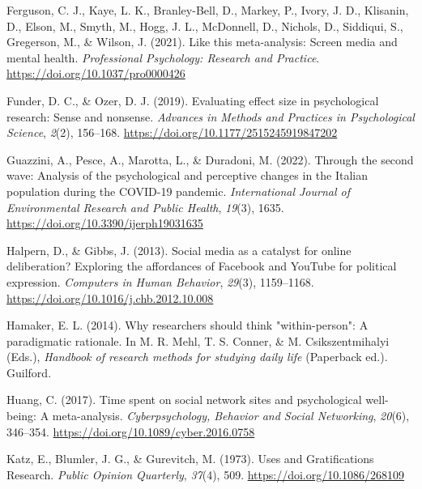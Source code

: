 \documentclass[
  man,floatsintext]{apa7}
\newlength{\cslhangindent}
\newlength{\cslentryspacingunit} %
\newenvironment{CSLReferences}[2] %
 {%
  \setlength{\parindent}{0pt}
  \ifodd #1
  \let\oldpar\par
  \def\par{\hangindent=\cslhangindent\oldpar}
  \fi
  \setlength{\parskip}{#2\cslentryspacingunit}
 }%
 {}
\begin{document}
\begin{CSLReferences}{1}{0}
\leavevmode{}%
Ferguson, C. J., Kaye, L. K., Branley-Bell, D., Markey, P., Ivory, J. D., Klisanin, D., Elson, M., Smyth, M., Hogg, J. L., McDonnell, D., Nichols, D., Siddiqui, S., Gregerson, M., \& Wilson, J. (2021). Like this meta-analysis: {Screen} media and mental health. \emph{Professional Psychology: Research and Practice}. \url{https://doi.org/10.1037/pro0000426}

\leavevmode{}%
Funder, D. C., \& Ozer, D. J. (2019). Evaluating effect size in psychological research: {Sense} and nonsense. \emph{Advances in Methods and Practices in Psychological Science}, \emph{2}(2), 156--168. \url{https://doi.org/10.1177/2515245919847202}

\leavevmode{}%
Guazzini, A., Pesce, A., Marotta, L., \& Duradoni, M. (2022). Through the second wave: {Analysis} of the psychological and perceptive changes in the {Italian} population during the {COVID-19} pandemic. \emph{International Journal of Environmental Research and Public Health}, \emph{19}(3), 1635. \url{https://doi.org/10.3390/ijerph19031635}

\leavevmode{}%
Halpern, D., \& Gibbs, J. (2013). Social media as a catalyst for online deliberation? {Exploring} the affordances of {Facebook} and {YouTube} for political expression. \emph{Computers in Human Behavior}, \emph{29}(3), 1159--1168. \url{https://doi.org/10.1016/j.chb.2012.10.008}

\leavevmode{}%
Hamaker, E. L. (2014). Why researchers should think "within-person": {A} paradigmatic rationale. In M. R. Mehl, T. S. Conner, \& M. Csikszentmihalyi (Eds.), \emph{Handbook of research methods for studying daily life} (Paperback ed.). {Guilford}.

\leavevmode{}%
Huang, C. (2017). Time spent on social network sites and psychological well-being: {A} meta-analysis. \emph{Cyberpsychology, Behavior and Social Networking}, \emph{20}(6), 346--354. \url{https://doi.org/10.1089/cyber.2016.0758}

\leavevmode{}%
Katz, E., Blumler, J. G., \& Gurevitch, M. (1973). Uses and {Gratifications Research}. \emph{Public Opinion Quarterly}, \emph{37}(4), 509. \url{https://doi.org/10.1086/268109}


\end{CSLReferences}
\end{document}
